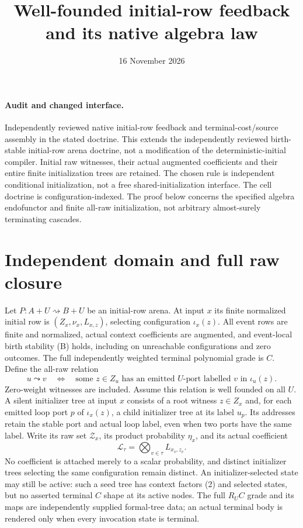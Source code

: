 \documentclass[11pt]{article}
\title{Well-founded initial-row feedback and its native algebra law}
\date{16 November 2026}
\begin{document}
\maketitle
\paragraph{Audit and changed interface.} Independently reviewed native initial-row feedback and terminal-cost/source assembly in the stated doctrine. This extends the independently reviewed birth-stable initial-row arena doctrine, not a modification of the deterministic-initial compiler. Initial raw witnesses, their actual augmented coefficients and their entire finite initialization trees are retained. The chosen rule is independent conditional initialization, not a free shared-initialization interface. The cell doctrine is configuration-indexed. The proof below concerns the specified algebra endofunctor and finite all-raw initialization, not arbitrary almost-surely terminating cascades.

\section{Independent domain and full raw closure}
Let $P:A+U\rightsquigarrow B+U$ be an initial-row arena. At input $x$ its finite normalized initial row is $(Z_x,\nu_x,L_{x,z})$, selecting configuration $\iota_x(z)$. All event rows are finite and normalized, actual context coefficients are augmented, and event-local birth stability (B) holds, including on unreachable configurations and zero outcomes. The full independently weighted terminal polynomial grade is $C$.
Define the all-raw relation
\[
 u\leadsto v\quad\Longleftrightarrow\quad
 \text{some }z\in Z_u\text{ has an emitted }U\text{-port labelled }v
 \text{ in }\iota_u(z).                                  \tag{1}
\]
Zero-weight witnesses are included. Assume this relation is well founded on all $U$. A silent initializer tree at input $x$ consists of a root witness $z\in Z_x$ and, for each emitted loop port $p$ of $\iota_x(z)$, a child initializer tree at its label $u_p$. Its addresses retain the stable port and actual loop label, even when two ports have the same label. Write its raw set $\mathcal Z_x$, its product probability $\eta_x$, and its actual coefficient
\[
 \mathcal L_\tau=\bigotimes_{v\in\tau}L_{x_v,z_v}.
                                                               \tag{2}
\]
No coefficient is attached merely to a scalar probability, and distinct initializer trees selecting the same configuration remain distinct. An initializer-selected state may still be active: such a seed tree has context factors (2) and selected states, but no asserted terminal $C$ shape at its active nodes. The full $R_U C$ grade and its maps are independently supplied formal-tree data; an actual terminal body is rendered only when every invocation state is terminal.
\end{document}
